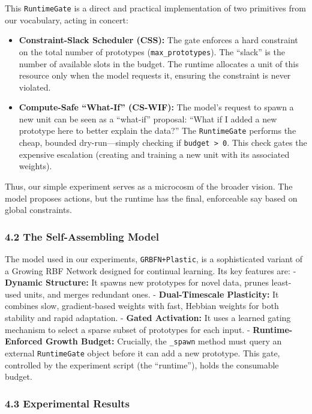 \documentclass[
]{article}
\providecommand{\tightlist}{%
  \setlength{\itemsep}{0pt}\setlength{\parskip}{0pt}}
\begin{document}
This \texttt{RuntimeGate} is a direct and practical implementation of
two primitives from our vocabulary, acting in concert:

\begin{itemize}
\tightlist
\item
  \textbf{Constraint-Slack Scheduler (CSS):} The gate enforces a hard
  constraint on the total number of prototypes
  (\texttt{max\_prototypes}). The ``slack'' is the number of available
  slots in the budget. The runtime allocates a unit of this resource
  only when the model requests it, ensuring the constraint is never
  violated.
\item
  \textbf{Compute-Safe ``What-If'' (CS-WIF):} The model's request to
  spawn a new unit can be seen as a ``what-if'' proposal: ``What if I
  added a new prototype here to better explain the data?'' The
  \texttt{RuntimeGate} performs the cheap, bounded dry-run---simply
  checking if \texttt{budget\ \textgreater{}\ 0}. This check gates the
  expensive escalation (creating and training a new unit with its
  associated weights).
\end{itemize}

Thus, our simple experiment serves as a microcosm of the broader vision.
The model proposes actions, but the runtime has the final, enforceable
say based on global constraints.

\hypertarget{the-self-assembling-model}{%
\subsubsection{4.2 The Self-Assembling
Model}\label{the-self-assembling-model}}

The model used in our experiments, \texttt{GRBFN+Plastic}, is a
sophisticated variant of a Growing RBF Network designed for continual
learning. Its key features are: - \textbf{Dynamic Structure:} It spawns
new prototypes for novel data, prunes least-used units, and merges
redundant ones. - \textbf{Dual-Timescale Plasticity:} It combines slow,
gradient-based weights with fast, Hebbian weights for both stability and
rapid adaptation. - \textbf{Gated Activation:} It uses a learned gating
mechanism to select a sparse subset of prototypes for each input. -
\textbf{Runtime-Enforced Growth Budget:} Crucially, the \texttt{\_spawn}
method must query an external \texttt{RuntimeGate} object before it can
add a new prototype. This gate, controlled by the experiment script (the
``runtime''), holds the consumable budget.

\hypertarget{experimental-results}{%
\subsubsection{4.3 Experimental Results}\label{experimental-results}}
\end{document}
